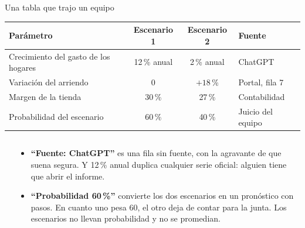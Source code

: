\documentclass{beamer}
\begin{document}
\begin{frame}{Una tabla que trajo un equipo}
\centering
{\footnotesize
\begin{tabular}{@{}L{4.2cm}cc L{3cm}@{}}
\toprule
Parámetro & Escenario 1 & Escenario 2 & Fuente \\
\midrule
Crecimiento del gasto de los hogares & 12\,\% anual & 2\,\% anual & ChatGPT \\
Variación del arriendo & 0 & $+18$\,\% & Portal, fila 7 \\
Margen de la tienda & 30\,\% & 27\,\% & Contabilidad \\
Probabilidad del escenario & 60\,\% & 40\,\% & Juicio del equipo \\
\bottomrule
\end{tabular}}
\medskip

\begin{columns}[T]
\begin{column}{0.46\textwidth}
\end{column}
\begin{column}{0.54\textwidth}
\footnotesize
\begin{itemize}\itemsep3pt
  \item \textbf{``Fuente: ChatGPT''} es una fila sin fuente, con la agravante de que suena segura. Y 12\,\% anual duplica cualquier serie oficial: alguien tiene que abrir el informe.
  \item \textbf{``Probabilidad 60\,\%''} convierte los dos escenarios en un pronóstico con pasos. En cuanto uno pesa 60, el otro deja de contar para la junta. Los escenarios no llevan probabilidad y no se promedian.
\end{itemize}
\end{column}
\end{columns}
\end{frame}
\end{document}
